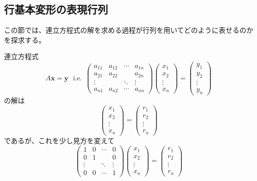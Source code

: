 \documentclass[dvipdfmx]{jsarticle}
\begin{document}
\subsection{行基本変形の表現行列}
この節では、連立方程式の解を求める過程が行列を用いてどのように表せるのかを探求する。\\\par
{}\vspace{3pt}\par
連立方程式
\[A\bm{x}=\bm{y}~~~\mathrm{i.e.}~~\begin{pmatrix}a_{11}&a_{12}&\cdots&a_{1n}\\a_{21}&a_{22}&{}&a_{2n}\\\vdots&{}&\ddots&\vdots\\a_{n1}&a_{n2}&\cdots&a_{nn}\end{pmatrix}\begin{pmatrix}x_1\\x_2\\\vdots\\x_n\end{pmatrix}=\begin{pmatrix}y_1\\y_2\\\vdots\\y_n\end{pmatrix}\]
の解は
\[\begin{pmatrix}x_1\\x_2\\\vdots\\x_n\end{pmatrix}=\begin{pmatrix}r_1\\r_2\\\vdots\\r_n\end{pmatrix}\]
であるが、これを少し見方を変えて
\[\begin{pmatrix}1&0&\cdots&0\\0&1&{}&0\\\vdots&{}&\ddots&\vdots\\0&0&\cdots&1\end{pmatrix}\begin{pmatrix}x_1\\x_2\\\vdots\\x_n\end{pmatrix}=\begin{pmatrix}r_1\\r_2\\\vdots\\r_n\end{pmatrix}\]
\end{document}
